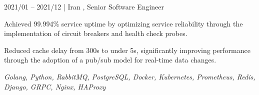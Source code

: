    \begin{twocolentry}{2021/01 -- 2021/12 | Iran}
        ,
        Senior Software Engineer
    \end{twocolentry}
    \begin{onecolentry}
        \begin{highlights}
            \item Achieved 99.994\% service uptime by optimizing service reliability through the implementation of circuit breakers and health check probes.
            \item Reduced cache delay from 300s to under 5s, significantly improving performance through the adoption of a pub/sub model for real-time data changes.
        \end{highlights}
        \textit{Golang, Python, RabbitMQ, PostgreSQL, Docker, Kubernetes, Prometheus, Redis, Django, GRPC, Nginx, HAProxy}
    \end{onecolentry}
    \vspace{0.3cm}


